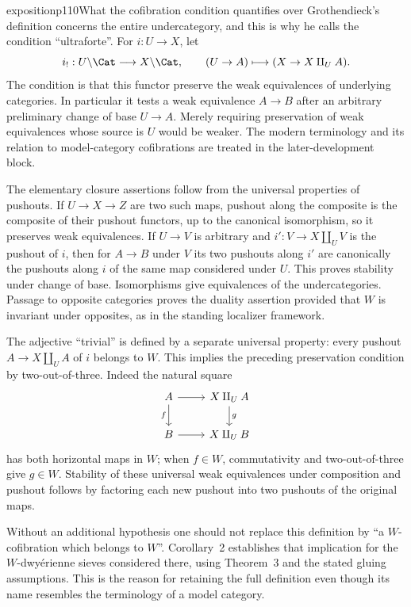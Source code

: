 \begin{dcomment}{exposition}{p110}{What the cofibration condition quantifies over}
Grothendieck's definition concerns the entire undercategory, and this is why he calls the condition ``ultraforte''. For $i:U\to X$, let
\[
 i_!:U\backslash\Cat\longrightarrow X\backslash\Cat,
 \qquad (U\to A)\longmapsto(X\to X\amalg_U A).
\]
The condition is that this functor preserve the weak equivalences of underlying categories. In particular it tests a weak equivalence $A\to B$ after an arbitrary preliminary change of base $U\to A$. Merely requiring preservation of weak equivalences whose source is $U$ would be weaker. The modern terminology and its relation to model-category cofibrations are treated in the later-development block.

The elementary closure assertions follow from the universal properties of pushouts. If $U\to X\to Z$ are two such maps, pushout along the composite is the composite of their pushout functors, up to the canonical isomorphism, so it preserves weak equivalences. If $U\to V$ is arbitrary and $i':V\to X\amalg_U V$ is the pushout of $i$, then for $A\to B$ under $V$ its two pushouts along $i'$ are canonically the pushouts along $i$ of the same map considered under $U$. This proves stability under change of base. Isomorphisms give equivalences of the undercategories. Passage to opposite categories proves the duality assertion provided that $W$ is invariant under opposites, as in the standing localizer framework.

The adjective ``trivial'' is defined by a separate universal property: every pushout $A\to X\amalg_U A$ of $i$ belongs to $W$. This implies the preceding preservation condition by two-out-of-three. Indeed the natural square
\[
\begin{tikzcd}
A\arrow[r]\arrow[d,"f"']&X\amalg_U A\arrow[d,"g"]\\
B\arrow[r]&X\amalg_U B
\end{tikzcd}
\]
has both horizontal maps in $W$; when $f\in W$, commutativity and two-out-of-three give $g\in W$. Stability of these universal weak equivalences under composition and pushout follows by factoring each new pushout into two pushouts of the original maps.

Without an additional hypothesis one should not replace this definition by ``a $W$-cofibration which belongs to $W$''. Corollary~2 establishes that implication for the $W$-dwyérienne sieves considered there, using Theorem~3 and the stated gluing assumptions. This is the reason for retaining the full definition even though its name resembles the terminology of a model category.
\end{dcomment}

